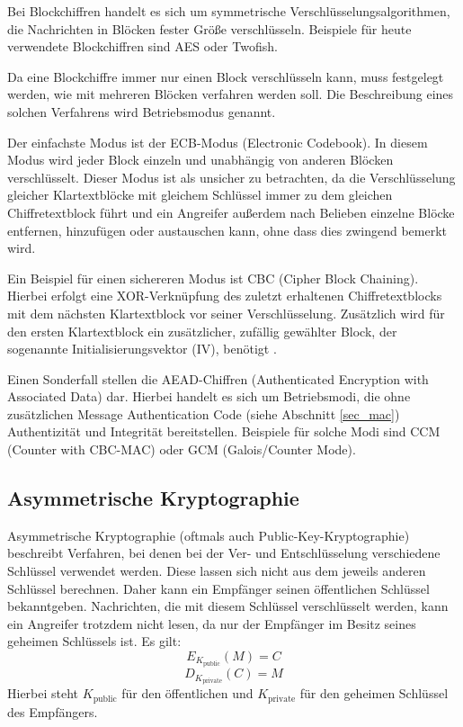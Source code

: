 \label{sec_block_cipher}

Bei Blockchiffren handelt es sich um symmetrische Verschlüsselungsalgorithmen, die Nachrichten in Blöcken fester Größe verschlüsseln.  Beispiele für heute verwendete Blockchiffren sind AES oder Twofish.

Da eine Blockchiffre immer nur einen Block verschlüsseln kann, muss festgelegt werden, wie mit mehreren Blöcken verfahren werden soll. Die Beschreibung eines solchen Verfahrens wird Betriebsmodus genannt.

Der einfachste Modus ist der ECB-Modus (Electronic Codebook). In diesem Modus wird jeder Block einzeln und unabhängig von anderen Blöcken verschlüsselt. Dieser Modus ist als unsicher zu betrachten, da die Verschlüsselung gleicher Klartextblöcke mit gleichem Schlüssel immer zu dem gleichen Chiffretextblock führt und ein Angreifer außerdem nach Belieben einzelne Blöcke entfernen, hinzufügen oder austauschen kann, ohne dass dies zwingend bemerkt wird.

Ein Beispiel für einen sichereren Modus ist CBC (Cipher Block Chaining). Hierbei erfolgt eine XOR-Verknüpfung des zuletzt erhaltenen Chiffretextblocks mit dem nächsten Klartextblock vor seiner Verschlüsselung. Zusätzlich wird für den ersten Klartextblock ein zusätzlicher, zufällig gewählter Block, der sogenannte Initialisierungsvektor (IV), benötigt \cite{Schneier2006}.

Einen Sonderfall stellen die AEAD-Chiffren (Authenticated Encryption with Associated Data) dar. Hierbei handelt es sich um Betriebsmodi, die ohne zusätzlichen Message Authentication Code (siehe Abschnitt \ref{sec_mac}) Authentizität und Integrität bereitstellen. Beispiele für solche Modi sind CCM (Counter with CBC-MAC) oder GCM (Galois/Counter Mode). 

\subsection{Asymmetrische Kryptographie}

Asymmetrische Kryptographie (oftmals auch Public-Key-Kryptographie) beschreibt Verfahren, bei denen bei der Ver- und Entschlüsselung verschiedene Schlüssel verwendet werden. Diese lassen sich nicht aus dem jeweils anderen Schlüssel berechnen. Daher kann ein Empfänger seinen öffentlichen Schlüssel bekanntgeben. Nachrichten, die mit diesem Schlüssel verschlüsselt werden, kann ein Angreifer trotzdem nicht lesen, da nur der Empfänger im Besitz seines geheimen Schlüssels ist. Es gilt: 
\[E_{K_{\text{public}}}(M)=C\] 
\[D_{K_{\text{private}}}(C)=M\] 
Hierbei steht \(K_{\text{public}}\) für den öffentlichen und \(K_{\text{private}}\) für den geheimen Schlüssel des Empfängers.

